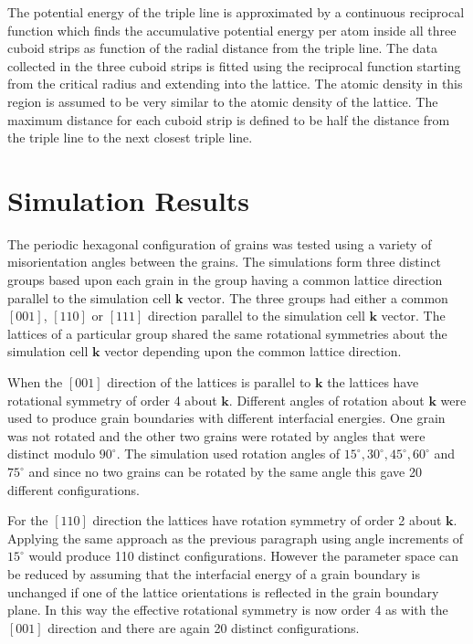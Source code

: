 \documentclass[12pt,a4paper,openany]{report}
\begin{document}
The potential energy of the triple line is approximated by a continuous reciprocal function which finds the accumulative potential energy per atom inside all three cuboid strips as function of the radial distance from the triple line. The data collected in the three cuboid strips is fitted using the reciprocal function starting from the critical radius and extending into the lattice. The atomic density in this region is assumed to be very similar to the atomic density of the lattice. The maximum distance for each cuboid strip is defined to be half the distance from the triple line to the next closest triple line.

\chapter{Simulation Results} \label{ch:SimulationResults}

The periodic hexagonal configuration of grains was tested using a variety of misorientation angles between the grains.  The simulations form three distinct groups based upon each grain in the group having a common lattice direction parallel to the simulation cell $\mathbf{k}$ vector. The three groups had either a common $[0 0 1]$, $[1 1 0]$ or $[1 1 1]$ direction parallel to the simulation cell $\mathbf{k}$ vector. The lattices of a particular group shared the same rotational symmetries about the simulation cell $\mathbf{k}$ vector depending upon the common lattice direction.

When the $[0 0 1]$ direction of the lattices is parallel to $\mathbf{k}$ the lattices have rotational symmetry of order 4 about $\mathbf{k}$.  Different angles of rotation about $\mathbf{k}$ were used to produce grain boundaries with different interfacial energies. One grain was not rotated and the other two grains were rotated by angles that were distinct modulo $90^{\circ}$. The simulation used rotation angles of $15^{\circ},30^{\circ},45^{\circ},60^{\circ}$ and $75^{\circ}$ and since no two grains can be rotated by the same angle this gave 20 different configurations.

For the $[1 1 0]$ direction the lattices have rotation symmetry of order 2 about $\mathbf{k}$. Applying the same approach as the previous paragraph using angle increments of $15^{\circ}$ would produce 110 distinct configurations. However the parameter space can be reduced by assuming that the interfacial energy of a grain boundary is unchanged if one of the lattice orientations is reflected in the grain boundary plane. In this way the effective rotational symmetry is now order 4 as with the $[0 0 1]$ direction and there are again 20 distinct configurations.  
\end{document}
